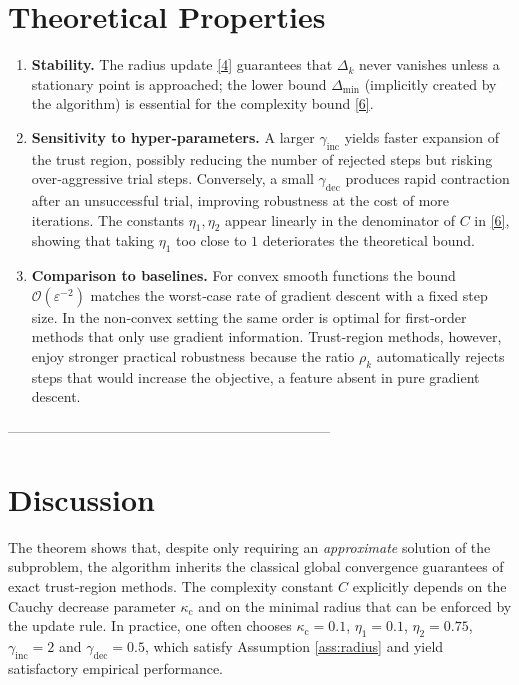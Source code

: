 \documentclass{article}
\begin{document}
\section*{Theoretical Properties}
\begin{enumerate}[label=\arabic*.]
\item \textbf{Stability.}
The radius update \eqref{4} guarantees that \(\Delta_{k}\) never
vanishes unless a stationary point is approached; the lower bound
\(\Delta_{\min}\) (implicitly created by the algorithm) is essential for
the complexity bound \eqref{6}.

\item \textbf{Sensitivity to hyper‑parameters.}
A larger \(\gamma_{\mathrm{inc}}\) yields faster expansion of the trust
region, possibly reducing the number of rejected steps but risking
over‑aggressive trial steps. Conversely, a small \(\gamma_{\mathrm{dec}}\)
produces rapid contraction after an unsuccessful trial, improving
robustness at the cost of more iterations. The constants \(\eta_{1},
\eta_{2}\) appear linearly in the denominator of \(C\) in \eqref{6},
showing that taking \(\eta_{1}\) too close to \(1\) deteriorates the
theoretical bound.

\item \textbf{Comparison to baselines.}
For convex smooth functions the bound \(\mathcal{O}(\varepsilon^{-2})\) matches
the worst‑case rate of gradient descent with a fixed step size.
In the non‑convex setting the same order is optimal for first‑order
methods that only use gradient information. Trust‑region methods,
however, enjoy stronger practical robustness because the ratio
\(\rho_{k}\) automatically rejects steps that would increase the
objective, a feature absent in pure gradient descent.
\end{enumerate}

---------------------------------------------------------------------

\section*{Discussion}
The theorem shows that, despite only requiring an \emph{approximate}
solution of the subproblem, the algorithm inherits the classical
global convergence guarantees of exact trust‑region methods. The
complexity constant \(C\) explicitly depends on the Cauchy decrease
parameter \(\kappa_{\mathrm{c}}\) and on the minimal radius that can be
enforced by the update rule. In practice, one often chooses
\(\kappa_{\mathrm{c}}=0.1\), \(\eta_{1}=0.1\), \(\eta_{2}=0.75\),
\(\gamma_{\mathrm{inc}}=2\) and \(\gamma_{\mathrm{dec}}=0.5\), which satisfy
Assumption \ref{ass:radius} and yield satisfactory empirical performance.
\end{document}
